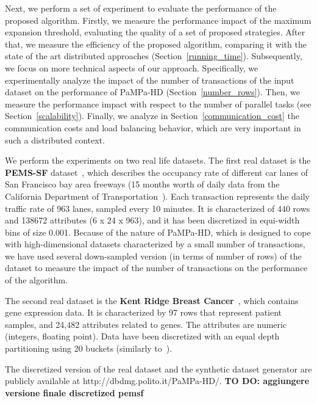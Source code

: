 Next, we perform a set of experiment to evaluate the performance of the proposed algorithm. Firstly, we measure the performance impact of the maximum expansion threshold, evaluating the quality of a set of proposed strategies. After that, we measure the efficiency of the proposed algorithm,
comparing it with the state of the art distributed approaches (Section~\ref{running_time}). Subsequently, we  focus on more technical aspects of our approach. Specifically, we experimentally analyze the impact of the number of transactions of the input dataset on the performance of PaMPa-HD (Section~\ref{number_rows}). Then, we measure the performance impact with respect to  the number of parallel tasks (see Section~\ref{scalability}). Finally, we analyze in Section~\ref{communication_cost} the communication costs and load balancing behavior, which are
very important in such a distributed context.

We perform the experiments on two real life datasets.
The first real dataset is the \textbf{PEMS-SF} dataset~\cite{uci}, 
which describes the occupancy rate of different car lanes of San Francisco bay area freeways (15 months worth of daily data from the California Department of Transportation~\cite{pems}).
Each transaction represents the daily traffic rate of 963 lanes, sampled every 10 minutes.
It is characterized of 440 rows and 138672 attributes (6 x 24 x 963), and it has been discretized in
equi-width bins of size 0.001.
Because of the nature of PaMPa-HD, which is designed to cope with high-dimensional datasets characterized by a small number of transactions, we have used several down-sampled version (in terms of number of rows) of the dataset to measure the impact of the number of transactions on the performance of the algorithm.

The second real dataset is the \textbf{Kent Ridge Breast Cancer}~\cite{breast_cancer_dataset}, which contains gene expression data.
It is characterized by 97 rows that represent patient samples, and
24,482 attributes related to genes. The attributes are numeric (integers, floating point).
Data have been discretized with an equal depth partitioning
using 20 buckets (similarly to~\cite{Zaki_Carpenter}).

The discretized version of the real dataset and the synthetic dataset generator
are publicly available at http://dbdmg.polito.it/PaMPa-HD/. \textbf{TO DO: aggiungere versione finale discretized pemsf}



